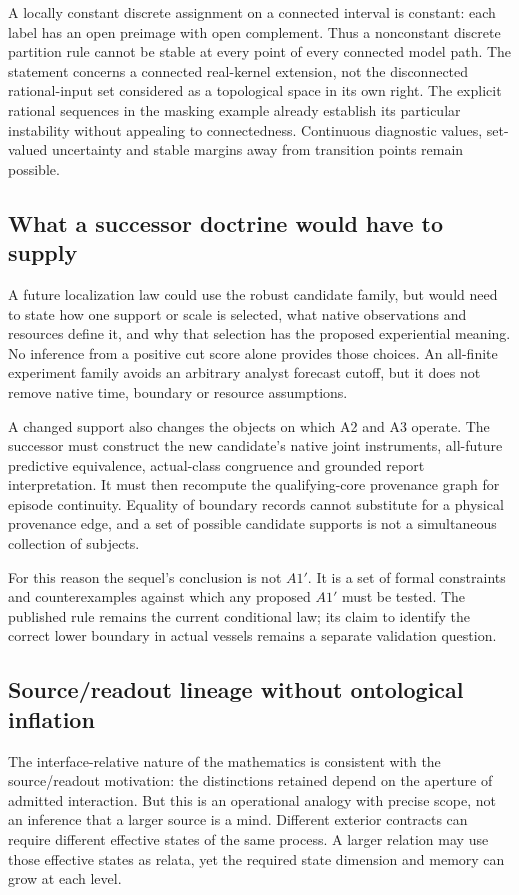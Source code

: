 \begin{remark}
A locally constant discrete assignment on a connected interval is constant: each label has an open preimage with open complement. Thus a nonconstant discrete partition rule cannot be stable at every point of every connected model path. The statement concerns a connected real-kernel extension, not the disconnected rational-input set considered as a topological space in its own right. The explicit rational sequences in the masking example already establish its particular instability without appealing to connectedness. Continuous diagnostic values, set-valued uncertainty and stable margins away from transition points remain possible.
\end{remark}

\subsection{What a successor doctrine would have to supply}
A future localization law could use the robust candidate family, but would need to state how one support or scale is selected, what native observations and resources define it, and why that selection has the proposed experiential meaning. No inference from a positive cut score alone provides those choices. An all-finite experiment family avoids an arbitrary analyst forecast cutoff, but it does not remove native time, boundary or resource assumptions.

A changed support also changes the objects on which A2 and A3 operate. The successor must construct the new candidate's native joint instruments, all-future predictive equivalence, actual-class congruence and grounded report interpretation. It must then recompute the qualifying-core provenance graph for episode continuity. Equality of boundary records cannot substitute for a physical provenance edge, and a set of possible candidate supports is not a simultaneous collection of subjects.

For this reason the sequel's conclusion is not \(A1'\). It is a set of formal constraints and counterexamples against which any proposed \(A1'\) must be tested. The published rule remains the current conditional law; its claim to identify the correct lower boundary in actual vessels remains a separate validation question.

\subsection{Source/readout lineage without ontological inflation}
The interface-relative nature of the mathematics is consistent with the source/readout motivation: the distinctions retained depend on the aperture of admitted interaction. But this is an operational analogy with precise scope, not an inference that a larger source is a mind. Different exterior contracts can require different effective states of the same process. A larger relation may use those effective states as relata, yet the required state dimension and memory can grow at each level.

